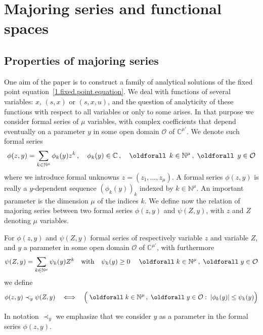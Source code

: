 \documentclass[AHL,Unicode,longabstracts,published]{cedram}
\theoremstyle{plain}
\newcommand*\Cbb{{\mathbb C}}%
\newcommand*\N{{\mathbb N}}
\renewcommand*{\forall}{\mathrel{\oldforall}}
\begin{document}
\section{Majoring series and functional spaces}\label{1.section.spaces}



\subsection{Properties of majoring series}\label{1.subsection.majoring}

One aim of the paper is to construct a family of analytical solutions of the fixed point equation~\eqref{1.fixed.point.equation}. We deal with functions of several variables: $x$, $(s,x)$ or $(s,x,u)$, and the question of analyticity of these functions with respect to all variables or only to some arises. In that purpose we consider formal series of $\mu$ variables, with complex coefficients that depend eventually on a parameter $y$ in some open domain $\mathcal{O}$ of $\Cbb^{\mu'}$. We denote such formal series
\[
\phi(z,y) = \sum_{k\in\N^{\mu}} \phi_{k}(y) z^{k} \,, \quad \phi_{k}(y) \in \Cbb \,, \quad \forall \, k\in\N^{\mu}\,, \; \forall \, y\in\mathcal{O}
\]
where we introduce formal unknowns $z = (z_1,\ldots,z_{\mu})$. A formal series $\phi(z,y)$ is really a $y$-dependent sequence $\left(\phi_k(y)\right)_k$ indexed by $k\in\N^{\mu}$. An important parameter is the dimension $\mu$ of the indices $k$. We define now the relation of majoring series between two formal series $\phi(z,y)$ and $\psi(Z,y)$, with $z$ and $Z$ denoting $\mu$ variables.

\begin{defi}\label{1.definition.maj}
For $\phi(z,y)$ and $\psi(Z,y)$ formal series of respectively variable $z$ and variable $Z$, and $y$ a parameter in some open domain $\mathcal{O}$ of $\Cbb^{\mu'}$, with furthermore
\[
\psi(Z,y) = \sum_{k\in\N^{\mu}} \psi_k(y) Z^{k} \quad \text{with} \quad \psi_k(y) \geq 0 \quad \forall k\in\N^{\mu} \,,\; \forall y\in\mathcal{O}
\]
we define
\begin{equation}\label{1.def.majoring.series}
\phi(z,y) \prec_{y} \psi(Z,y) \quad \Longleftrightarrow \quad \Big(\forall k\in\N^{\mu}\,,\; \forall y\in\mathcal{O} : \; |\phi_k(y)| \leq \psi_k(y) \Big)
\end{equation}
\end{defi}

\begin{rema}
In notation $\prec_{y}$ we emphasize that we consider $y$ as a parameter in the formal series $\phi(z,y)$.
\end{rema}
\end{document}
